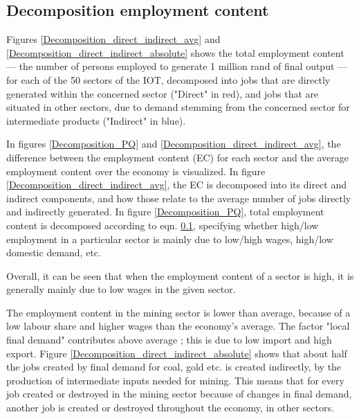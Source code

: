\documentclass[12pt,english]{article}
\begin{document}
\subsection{Decomposition employment content}
Figures \ref{Decomposition_direct_indirect_avg} and \ref{Decomposition_direct_indirect_absolute} shows the total employment content --- the number of persons employed to generate 1 million rand of final output --- for each of the 50 sectors of the IOT, decomposed into jobs that are directly generated within the concerned sector ("Direct" in red), and jobs that are situated in other sectors, due to demand stemming from the concerned sector for intermediate products ("Indirect" in blue).

In figures \ref{Decomposition_PQ} and \ref{Decomposition_direct_indirect_avg}, the difference between the employment content (EC) for each sector and the average employment content over the economy is visualized. In figure \ref{Decomposition_direct_indirect_avg},  the EC is decomposed into its direct and indirect components, and how those relate to the average number of jobs directly and indirectly generated. In figure \ref{Decomposition_PQ}, total employment content is decomposed according to eqn. \ref{}, specifying whether high/low employment in a particular sector is mainly due to low/high wages, high/low domestic demand, etc.

Overall, it can be seen that when the employment content of a sector is high, it is generally mainly due to low wages in the given sector. 

The employment content in the mining sector is lower than average, because of a low labour share and higher wages than the economy's average. The factor "local final demand" contributes above average ; this is due to low import and high export. Figure \ref{Decomposition_direct_indirect_absolute} shows that about half the jobs created by final demand for coal, gold etc. is created indirectly, by the production of intermediate inputs needed for mining. This means that for every job created or destroyed in the mining sector because of changes in final demand, another job is created or destroyed throughout the economy, in other sectors.

\end{document}
